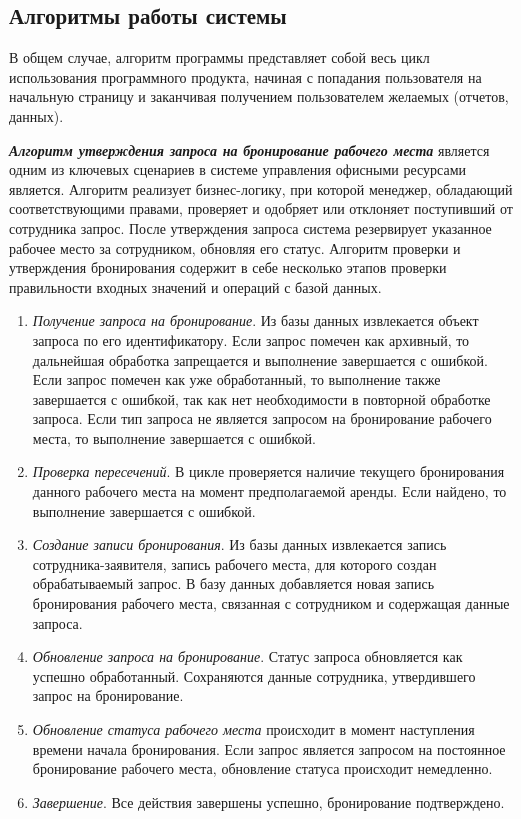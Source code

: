 \subsection{Алгоритмы работы системы}
\label{sub:system-design:algorithms}

В общем случае, алгоритм программы представляет собой весь цикл использования программного продукта, начиная с попадания пользователя на начальную страницу и заканчивая получением пользователем желаемых (отчетов, данных).

\textbf{\textit{Алгоритм утверждения запроса на бронирование рабочего места}} является одним из ключевых сценариев в системе управления офисными ресурсами является. Алгоритм реализует бизнес-логику, при которой менеджер, обладающий соответствующими правами, проверяет и одобряет или отклоняет поступивший от сотрудника запрос. После утверждения запроса система резервирует указанное рабочее место за сотрудником, обновляя его статус. Алгоритм проверки и утверждения бронирования содержит в себе несколько этапов проверки правильности входных значений и операций с базой данных.

\begin{enumerate}
    \item \textit{Получение запроса на бронирование}. Из базы данных извлекается объект запроса по его идентификатору. Если запрос помечен как архивный, то дальнейшая обработка запрещается и выполнение завершается с ошибкой. Если запрос помечен как уже обработанный, то выполнение также завершается с ошибкой, так как нет необходимости в повторной обработке запроса. Если тип запроса не является запросом на бронирование рабочего места, то выполнение завершается с ошибкой.
    \item \textit{Проверка пересечений}. В цикле проверяется наличие текущего бронирования данного рабочего места на момент предполагаемой аренды. Если найдено, то выполнение завершается с ошибкой.
    \item \textit{Создание записи бронирования}. Из базы данных извлекается запись сотрудника-заявителя, запись рабочего места, для которого создан обрабатываемый запрос. В базу данных добавляется новая запись бронирования рабочего места, связанная с сотрудником и содержащая данные запроса.
    \item \textit{Обновление запроса на бронирование}. Статус запроса обновляется как успешно обработанный. Сохраняются данные сотрудника, утвердившего запрос на бронирование.
    \item \textit{Обновление статуса рабочего места} происходит в момент наступления времени начала бронирования. Если запрос является запросом на постоянное бронирование рабочего места, обновление статуса происходит немедленно.
    \item \textit{Завершение}. Все действия завершены успешно, бронирование подтверждено.
\end{enumerate}

